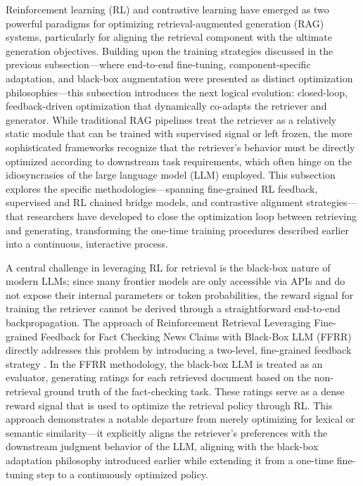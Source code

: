 \documentclass[11pt]{article}
\begin{document}
Reinforcement learning (RL) and contrastive learning have emerged as two powerful paradigms for optimizing retrieval-augmented generation (RAG) systems, particularly for aligning the retrieval component with the ultimate generation objectives. Building upon the training strategies discussed in the previous subsection---where end-to-end fine-tuning, component-specific adaptation, and black-box augmentation were presented as distinct optimization philosophies---this subsection introduces the next logical evolution: closed-loop, feedback-driven optimization that dynamically co-adapts the retriever and generator. While traditional RAG pipelines treat the retriever as a relatively static module that can be trained with supervised signal or left frozen, the more sophisticated frameworks recognize that the retriever's behavior must be directly optimized according to downstream task requirements, which often hinge on the idiosyncrasies of the large language model (LLM) employed. This subsection explores the specific methodologies---spanning fine-grained RL feedback, supervised and RL chained bridge models, and contrastive alignment strategies---that researchers have developed to close the optimization loop between retrieving and generating, transforming the one-time training procedures described earlier into a continuous, interactive process.

A central challenge in leveraging RL for retrieval is the black-box nature of modern LLMs; since many frontier models are only accessible via APIs and do not expose their internal parameters or token probabilities, the reward signal for training the retriever cannot be derived through a straightforward end-to-end backpropagation. The approach of Reinforcement Retrieval Leveraging Fine-grained Feedback for Fact Checking News Claims with Black-Box LLM (FFRR) directly addresses this problem by introducing a two-level, fine-grained feedback strategy \cite{ref79}. In the FFRR methodology, the black-box LLM is treated as an evaluator, generating ratings for each retrieved document based on the non-retrieval ground truth of the fact-checking task. These ratings serve as a dense reward signal that is used to optimize the retrieval policy through RL. This approach demonstrates a notable departure from merely optimizing for lexical or semantic similarity---it explicitly aligns the retriever's preferences with the downstream judgment behavior of the LLM, aligning with the black-box adaptation philosophy introduced earlier while extending it from a one-time fine-tuning step to a continuously optimized policy.
\end{document}
